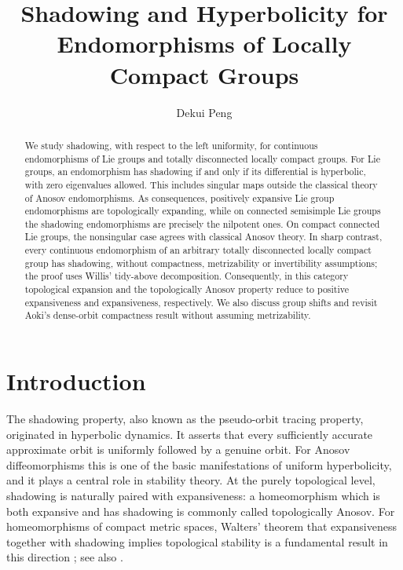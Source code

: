 \documentclass[12pt]{amsart}
\theoremstyle{definition}
\numberwithin{equation}{section}
\theoremstyle{remark}
\begin{document}
\title[Shadowing and Hyperbolicity]{Shadowing and Hyperbolicity for Endomorphisms of Locally Compact Groups}

\author[D. Peng]{Dekui Peng}
 \address[D. Peng]
	{\hfill\break Institute of Mathematics,
		\hfill\break Nanjing Normal University, 210023,
	\hfill\break China}





\begin{abstract}
We study shadowing, with respect to the left uniformity, for continuous
endomorphisms of Lie groups and totally disconnected locally compact
groups. For Lie groups, an endomorphism has shadowing if and only if its
differential is hyperbolic, with zero eigenvalues allowed. This includes
singular maps outside the classical theory of Anosov endomorphisms. As
consequences, positively expansive Lie group endomorphisms are
topologically expanding, while on connected semisimple Lie groups the
shadowing endomorphisms are precisely the nilpotent ones. On compact
connected Lie groups, the nonsingular case agrees with classical Anosov
theory. In sharp contrast, every continuous endomorphism of an arbitrary
totally disconnected locally compact group has shadowing, without
compactness, metrizability or invertibility assumptions; the proof uses
Willis' tidy-above decomposition. Consequently, in this category
topological expansion and the topologically Anosov property reduce to
positive expansiveness and expansiveness, respectively. We also discuss
group shifts and revisit Aoki's dense-orbit compactness result without
assuming metrizability.
\end{abstract}

\maketitle

\section{Introduction}

The shadowing property, also known as the pseudo-orbit tracing property,
originated in hyperbolic dynamics. It asserts that every sufficiently
accurate approximate orbit is uniformly followed by a genuine orbit. For
Anosov diffeomorphisms this is one of the basic manifestations of uniform
hyperbolicity, and it plays a central role in stability theory. At the
purely topological level, shadowing is naturally paired with expansiveness:
a homeomorphism which is both expansive and has shadowing is commonly
called topologically Anosov. For homeomorphisms of compact metric spaces,
Walters' theorem that expansiveness together with shadowing implies
topological stability is a fundamental result in this direction
\cite{Walters}; see also
\cite{AokiHiraide,DasLeeRichesonWiseman}.
\end{document}
